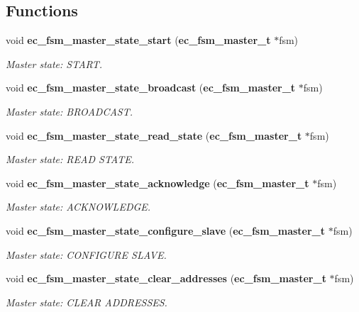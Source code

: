 \subsection*{Functions}
\begin{DoxyCompactItemize}
\item 
void {\bf ec\-\_\-fsm\-\_\-master\-\_\-state\-\_\-start} ({\bf ec\-\_\-fsm\-\_\-master\-\_\-t} $\ast$fsm)
\begin{DoxyCompactList}\small\item\em Master state\-: S\-T\-A\-R\-T. \end{DoxyCompactList}\item 
void {\bf ec\-\_\-fsm\-\_\-master\-\_\-state\-\_\-broadcast} ({\bf ec\-\_\-fsm\-\_\-master\-\_\-t} $\ast$fsm)
\begin{DoxyCompactList}\small\item\em Master state\-: B\-R\-O\-A\-D\-C\-A\-S\-T. \end{DoxyCompactList}\item 
void {\bf ec\-\_\-fsm\-\_\-master\-\_\-state\-\_\-read\-\_\-state} ({\bf ec\-\_\-fsm\-\_\-master\-\_\-t} $\ast$fsm)
\begin{DoxyCompactList}\small\item\em Master state\-: R\-E\-A\-D S\-T\-A\-T\-E. \end{DoxyCompactList}\item 
void {\bf ec\-\_\-fsm\-\_\-master\-\_\-state\-\_\-acknowledge} ({\bf ec\-\_\-fsm\-\_\-master\-\_\-t} $\ast$fsm)
\begin{DoxyCompactList}\small\item\em Master state\-: A\-C\-K\-N\-O\-W\-L\-E\-D\-G\-E. \end{DoxyCompactList}\item 
void {\bf ec\-\_\-fsm\-\_\-master\-\_\-state\-\_\-configure\-\_\-slave} ({\bf ec\-\_\-fsm\-\_\-master\-\_\-t} $\ast$fsm)
\begin{DoxyCompactList}\small\item\em Master state\-: C\-O\-N\-F\-I\-G\-U\-R\-E S\-L\-A\-V\-E. \end{DoxyCompactList}\item 
void {\bf ec\-\_\-fsm\-\_\-master\-\_\-state\-\_\-clear\-\_\-addresses} ({\bf ec\-\_\-fsm\-\_\-master\-\_\-t} $\ast$fsm)
\begin{DoxyCompactList}\small\item\em Master state\-: C\-L\-E\-A\-R A\-D\-D\-R\-E\-S\-S\-E\-S. \end{DoxyCompactList}\item 

\end{DoxyCompactItemize}
